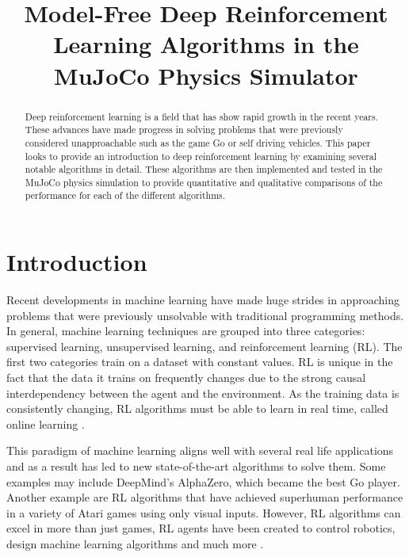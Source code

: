 \documentclass[conference]{IEEEtran}
\begin{document}
\title{Model-Free Deep Reinforcement Learning Algorithms in the MuJoCo Physics Simulator}

\author{
    \and
}
\maketitle

\begin{abstract}
    Deep reinforcement learning is a field that has show rapid growth in the recent years. These advances have made progress in solving problems that were previously considered unapproachable such as the game Go or self driving vehicles. This paper looks to provide an introduction to deep reinforcement learning by examining several notable algorithms in detail. These algorithms are then implemented and tested in the MuJoCo physics simulation to provide quantitative and qualitative comparisons of the performance for each of the different algorithms.
\end{abstract}

\section{Introduction}

Recent developments in machine learning have made huge strides in approaching problems that were previously unsolvable with traditional programming methods. In general, machine learning techniques are grouped into three categories: supervised learning, unsupervised learning, and reinforcement learning (RL). The first two categories train on a dataset with constant values. RL is unique in the fact that the data it trains on frequently changes due to the strong causal interdependency between the agent and the environment. As the training data is consistently changing, RL algorithms must be able to learn in real time, called online learning \cite{rl_application}.

This paradigm of machine learning aligns well with several real life applications and as a result has led to new state-of-the-art algorithms to solve them.  Some examples may include DeepMind's AlphaZero, which became the best Go player. Another example are RL algorithms that have achieved superhuman performance in a variety of Atari games using only visual inputs. However, RL algorithms can excel in more than just games, RL agents have been created to control robotics, design machine learning algorithms and much more \cite{deep_rl_survey}.
\end{document}
